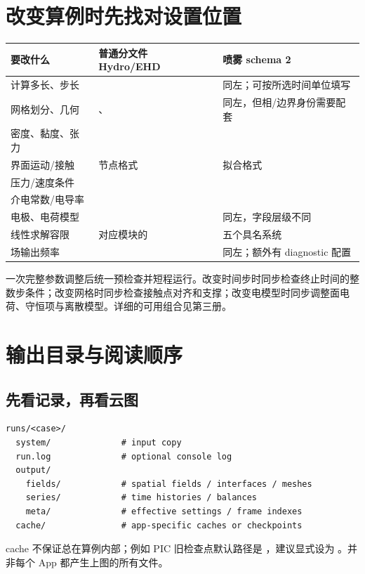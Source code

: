 \documentclass[a4paper,11pt]{article}
\begin{document}
\section{改变算例时先找对设置位置}
\begin{longtable}{L{.26\linewidth}L{.31\linewidth}L{.35\linewidth}}
\toprule 要改什么 & 普通分文件 Hydro/EHD & 喷雾 schema 2 \\\midrule\endhead
计算多长、步长 &  & 同左；可按所选时间单位填写 \\
网格划分、几何 & 、 & 同左，但相/边界身份需要配套 \\
密度、黏度、张力 &  &  \\
界面运动/接触 &  节点格式 &  拟合格式 \\
压力/速度条件 &  &  \\
介电常数/电导率 &  &  \\
电极、电荷模型 &  & 同左，字段层级不同 \\
线性求解容限 & 对应模块的  &  五个具名系统 \\
场输出频率 &  & 同左；额外有 diagnostic 配置 \\
\bottomrule
\end{longtable}
一次完整参数调整后统一预检查并短程运行。改变时间步时同步检查终止时间的整数步条件；改变网格时同步检查接触点对齐和支撑；改变电模型时同步调整面电荷、守恒项与离散模型。详细的可用组合见第三册。

\section{输出目录与阅读顺序}
\subsection{先看记录，再看云图}
\begin{lstlisting}
runs/<case>/
  system/              # input copy
  run.log              # optional console log
  output/
    fields/            # spatial fields / interfaces / meshes
    series/            # time histories / balances
    meta/              # effective settings / frame indexes
  cache/               # app-specific caches or checkpoints
\end{lstlisting}
cache 不保证总在算例内部；例如 PIC 旧检查点默认路径是 ，建议显式设为 。并非每个 App 都产生上图的所有文件。
\end{document}
